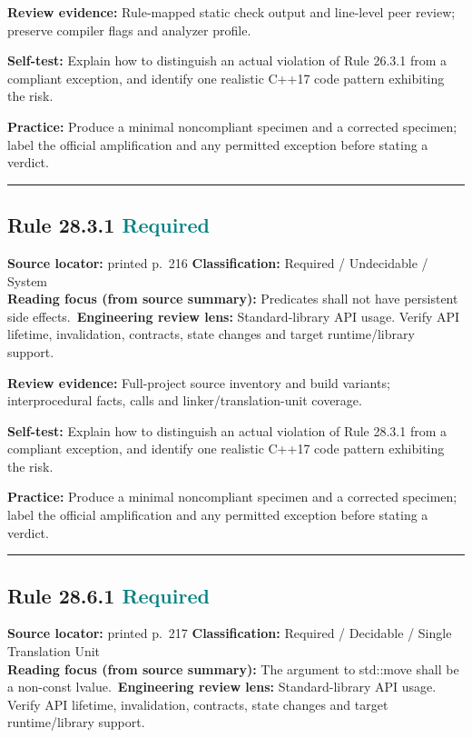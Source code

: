 \documentclass[10pt,letterpaper]{article}
\begin{document}
\textbf{Review evidence:} Rule-mapped static check output and line-level peer review; preserve compiler flags and analyzer profile.

\textbf{Self-test:} Explain how to distinguish an actual violation of Rule 26.3.1 from a compliant exception, and identify one realistic C++17 code pattern exhibiting the risk.\par
\textbf{Practice:} Produce a minimal noncompliant specimen and a corrected specimen; label the official amplification and any permitted exception before stating a verdict.
\smallskip\hrule\smallskip
\subsection*{Rule 28.3.1 \enspace \texorpdfstring{\small\textcolor{teal}{Required}}{Required}}
\noindent\textbf{Source locator:} printed p.~216 \quad\textbf{Classification:} Required / Undecidable / System\\
\textbf{Reading focus (from source summary):} Predicates shall not have persistent side effects.\
\textbf{Engineering review lens:} Standard-library API usage. Verify API lifetime, invalidation, contracts, state changes and target runtime/library support.

\textbf{Review evidence:} Full-project source inventory and build variants; interprocedural facts, calls and linker/translation-unit coverage.

\textbf{Self-test:} Explain how to distinguish an actual violation of Rule 28.3.1 from a compliant exception, and identify one realistic C++17 code pattern exhibiting the risk.\par
\textbf{Practice:} Produce a minimal noncompliant specimen and a corrected specimen; label the official amplification and any permitted exception before stating a verdict.
\smallskip\hrule\smallskip
\subsection*{Rule 28.6.1 \enspace \texorpdfstring{\small\textcolor{teal}{Required}}{Required}}
\noindent\textbf{Source locator:} printed p.~217 \quad\textbf{Classification:} Required / Decidable / Single Translation Unit\\
\textbf{Reading focus (from source summary):} The argument to std::move shall be a non-const lvalue.\
\textbf{Engineering review lens:} Standard-library API usage. Verify API lifetime, invalidation, contracts, state changes and target runtime/library support.
\end{document}
